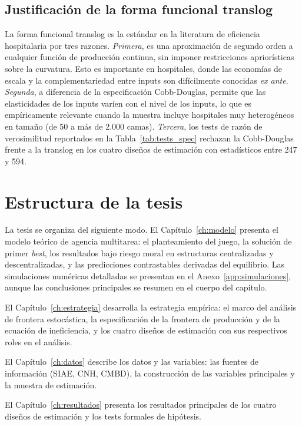 \documentclass[12pt, a4paper, twoside, openright]{book}
\theoremstyle{plain}
\theoremstyle{definition}
\theoremstyle{remark}
\begin{document}
\subsection{Justificación de la forma funcional translog}

La forma funcional translog \citep{zuckerman1994,linna1998} es la estándar en la literatura de eficiencia hospitalaria por tres razones. \textit{Primera}, es una aproximación de segundo orden a cualquier función de producción continua, sin imponer restricciones apriorísticas sobre la curvatura. Esto es importante en hospitales, donde las economías de escala y la complementariedad entre inputs son difícilmente conocidas \textit{ex ante}. \textit{Segunda}, a diferencia de la especificación Cobb-Douglas, permite que las elasticidades de los inputs varíen con el nivel de los inputs, lo que es empíricamente relevante cuando la muestra incluye hospitales muy heterogéneos en tamaño (de 50 a más de 2.000 camas). \textit{Tercera}, los tests de razón de verosimilitud reportados en la Tabla~\ref{tab:tests_spec} rechazan la Cobb-Douglas frente a la translog en los cuatro diseños de estimación con estadísticos entre 247 y 594.

\section{Estructura de la tesis}

La tesis se organiza del siguiente modo. El Capítulo~\ref{ch:modelo} presenta el modelo teórico de agencia multitarea: el planteamiento del juego, la solución de primer \textit{best}, los resultados bajo riesgo moral en estructuras centralizadas y descentralizadas, y las predicciones contrastables derivadas del equilibrio. Las simulaciones numéricas detalladas se presentan en el Anexo~\ref{app:simulaciones}, aunque las conclusiones principales se resumen en el cuerpo del capítulo.

El Capítulo~\ref{ch:estrategia} desarrolla la estrategia empírica: el marco del análisis de frontera estocástica, la especificación de la frontera de producción y de la ecuación de ineficiencia, y los cuatro diseños de estimación con sus respectivos roles en el análisis.

El Capítulo~\ref{ch:datos} describe los datos y las variables: las fuentes de información (SIAE, CNH, CMBD), la construcción de las variables principales y la muestra de estimación.

El Capítulo~\ref{ch:resultados} presenta los resultados principales de los cuatro diseños de estimación y los tests formales de hipótesis.
\end{document}

